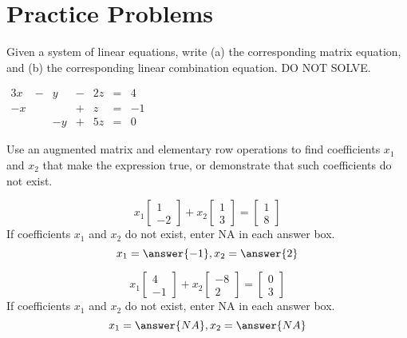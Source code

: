\documentclass{ximera}
\begin{document}
\section*{Practice Problems}
 \begin{problem}\label{prob:systomatrixeq}
Given a system of linear equations, write (a) the corresponding matrix equation, and (b) the corresponding linear combination equation.  DO NOT SOLVE.
\begin{center}
$\begin{array}{ccccccc}
       3x&- &y &- &2z&= &4 \\
     -x& & &+ &z&= &-1 \\
     & &-y &+ &5z&=&0
    \end{array}$
\end{center}
\end{problem}
\begin{problem}
Use an augmented matrix and elementary row operations to find coefficients $x_1$ and $x_2$ that make the expression true, or demonstrate that such coefficients do not exist.
 \begin{problem}\label{prob:lincombeq1}

    $$ x_1\begin{bmatrix}
           1\\
           -2
         \end{bmatrix}+ x_2\begin{bmatrix}
           1\\
           3
         \end{bmatrix}=\begin{bmatrix}
           1\\
           8
         \end{bmatrix}$$
 If coefficients $x_1$ and $x_2$ do not exist, enter NA in each answer box.        
 $$x_1=\answer{-1}, x_2=\answer{2}$$        
         \end{problem}



\begin{problem}\label{prob:lincombeq2}

 $$ x_1\begin{bmatrix}
           4\\
           -1
         \end{bmatrix}+ x_2\begin{bmatrix}
           -8\\
           2
         \end{bmatrix}=\begin{bmatrix}
           0\\
           3
         \end{bmatrix}$$
If coefficients $x_1$ and $x_2$ do not exist, enter NA in each answer box.        
 $$x_1=\answer{NA}, x_2=\answer{NA}$$ 
  \end{problem}

\end{problem}
 
\end{document}
